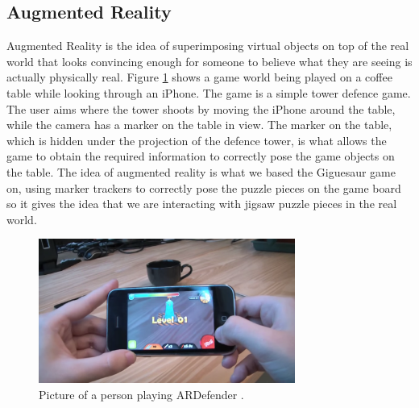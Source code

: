 \documentclass{article}
\begin{document}
\subsection{Augmented Reality} \label{ssec:AugReality}
Augmented Reality is the idea of superimposing virtual objects on top of the
real world that looks convincing enough for someone to believe what they are
seeing is actually physically real. Figure \ref{fig:ARDefender} shows a game
world being played on a coffee table while looking through an iPhone. The game
is a simple tower defence game. The user aims where the tower shoots by
moving the iPhone around the table, while the camera has a marker on the table in
view. The marker on the table, which is hidden under the projection of the
defence tower, is what allows the game to obtain the required information to
correctly pose the game objects on the table. The idea of augmented reality is
what we based the Giguesaur game on, using marker trackers to correctly pose the
puzzle pieces on the game board so it gives the idea that we are interacting
with jigsaw puzzle pieces in the real world.

\begin{figure}[ht]
\begin{center}
\includegraphics[width=0.75\textwidth]{images/ARDefenderImage}
\caption{Picture of a person playing ARDefender \cite{img:ARDefender}.}
\label{fig:ARDefender}
\end{center}
\end{figure}

\end{document}
